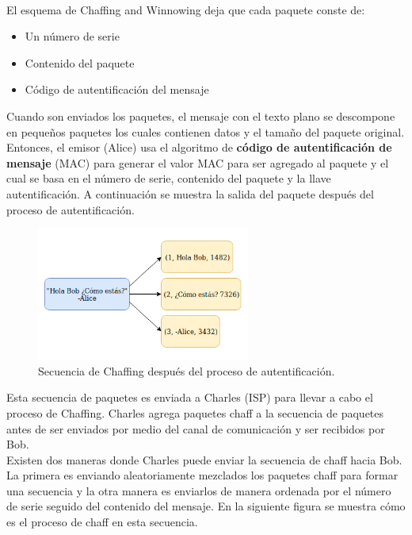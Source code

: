 \documentclass[12pt, a4paper, titlepage]{report}
\begin{document}
		\paragraph{}
		El esquema de Chaffing and Winnowing deja que cada paquete conste de: 
		\begin{itemize}
		    \item Un número de serie
		    \item Contenido del paquete
		    \item Código de autentificación del mensaje
		\end{itemize}
		Cuando son enviados los paquetes, el mensaje con el texto plano se descompone en pequeños paquetes los cuales contienen datos y el tamaño del paquete original. Entonces, el emisor (Alice) usa el algoritmo de \textbf{código de autentificación de mensaje} (MAC) para generar el valor MAC para ser agregado al paquete y el cual se basa en el número de serie, contenido del paquete y la llave autentificación. A continuación se muestra la salida del paquete después del proceso de autentificaci\'on.
		\begin{figure}[H]
			\begin{center}	                  \includegraphics[width=7cm]{./imagenes/MarcoTeorico/descomposicionChaffing.png}
				\caption{Secuencia de Chaffing después del proceso de autentificación.}
			\end{center}
		\end{figure}
		Esta secuencia de paquetes es enviada a Charles (ISP) para llevar a cabo el proceso de Chaffing. Charles agrega paquetes chaff a la secuencia de paquetes antes de ser enviados por medio del canal de comunicación y ser recibidos por Bob. \\
		Existen dos maneras donde Charles puede enviar la secuencia de chaff hacia Bob. La primera es enviando aleatoriamente mezclados los paquetes chaff para formar una secuencia y la otra manera es enviarlos de manera ordenada por el n\'umero de serie seguido del contenido del mensaje. En la siguiente figura se muestra cómo es el proceso de chaff en esta secuencia.
\end{document}
